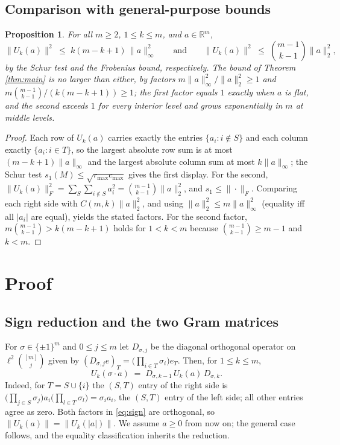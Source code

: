 \documentclass[11pt]{article}
\newtheorem{proposition}[theorem]{Proposition}
\theoremstyle{remark}
\begin{document}
\subsection{Comparison with general-purpose bounds}
\begin{proposition}\label{prop:generic}
For all $m\ge2$, $1\le k\le m$, and $a\in\mathbb R^m$,
\[
\|U_k(a)\|^2\;\le\;k(m-k+1)\,\|a\|_\infty^2
\qquad\text{and}\qquad
\|U_k(a)\|^2\;\le\;\binom{m-1}{k-1}\|a\|_2^2 ,
\]
by the Schur test and the Frobenius bound, respectively. The bound of
Theorem \ref{thm:main} is no larger than either, by factors
$m\|a\|_\infty^2/\|a\|_2^2\ge1$ and
$m\binom{m-1}{k-1}/(k(m-k+1))\ge1$; the first factor equals $1$ exactly
when $a$ is flat, and the second exceeds $1$ for every interior level
and grows exponentially in $m$ at middle levels.
\end{proposition}
\begin{proof}
Each row of $U_k(a)$ carries exactly the entries $\{a_i:i\notin S\}$ and
each column exactly $\{a_i:i\in T\}$, so the largest absolute row sum is
at most $(m-k+1)\|a\|_\infty$ and the largest absolute column sum at
most $k\|a\|_\infty$; the Schur test
$s_1(M)\le\sqrt{r_{\max}c_{\max}}$ gives the first display. For the
second, $\|U_k(a)\|_F^2=\sum_{S}\sum_{i\notin S}a_i^2=
\binom{m-1}{k-1}\|a\|_2^2$, and $s_1\le\|\cdot\|_F$. Comparing each
right side with $C(m,k)\|a\|_2^2$, and using
$\|a\|_2^2\le m\|a\|_\infty^2$ (equality iff all $|a_i|$ are equal),
yields the stated factors. For the second factor,
$m\binom{m-1}{k-1}>k(m-k+1)$ holds for $1<k<m$ because
$\binom{m-1}{k-1}\ge m-1$ and $k<m$.
\end{proof}

\section{Proof}

\subsection{Sign reduction and the two Gram matrices}
For $\sigma\in\{\pm1\}^m$ and $0\le j\le m$ let $D_{\sigma,j}$ be the
diagonal orthogonal operator on $\ell^2\binom{[m]}{j}$ given by
$(D_{\sigma,j}e)_T=\bigl(\prod_{i\in T}\sigma_i\bigr)e_T$. Then, for
$1\le k\le m$,
\begin{equation}\label{eq:sign}
U_k(\sigma\!\cdot\! a)\;=\;D_{\sigma,k-1}\,U_k(a)\,D_{\sigma,k}.
\end{equation}
Indeed, for $T=S\cup\{i\}$ the $(S,T)$ entry of the right side is
$\bigl(\prod_{j\in S}\sigma_j\bigr)a_i\bigl(\prod_{l\in T}\sigma_l\bigr)
=\sigma_i a_i$, the $(S,T)$ entry of the left side; all other entries
agree as zero. Both factors in \eqref{eq:sign} are orthogonal, so
$\|U_k(a)\|=\|U_k(|a|)\|$. We assume $a\ge0$ from now on; the general case
follows, and the equality classification inherits the reduction.
\end{document}
